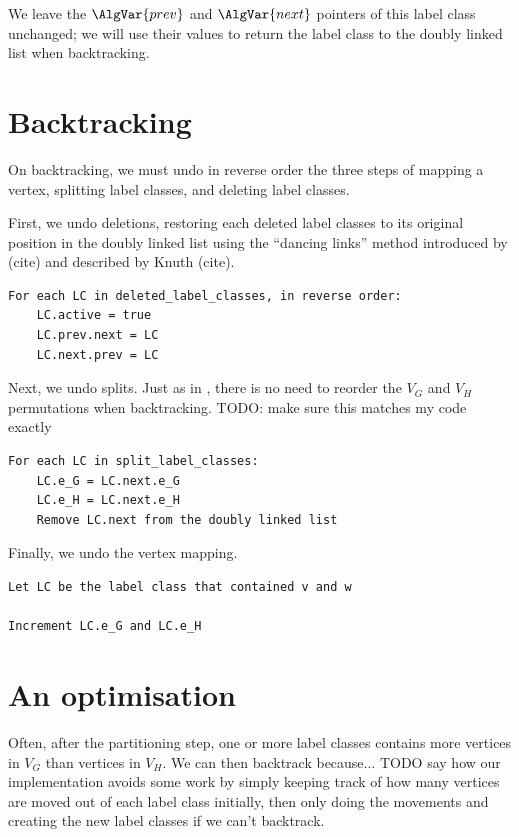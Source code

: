 We leave the $\AlgVar{prev}$ and $\AlgVar{next}$ 
pointers of this label class unchanged; we will use their values to return
the label class to the doubly linked list when backtracking.

\section{Backtracking}

On backtracking, we must undo in reverse order the three steps of
mapping a vertex, splitting label classes, and deleting label classes.

First, we undo deletions, restoring each deleted label classes to its
original position in the doubly linked list using the ``dancing links'' method
introduced by (cite) and described by Knuth (cite).

{
\scriptsize
\begin{verbatim}
For each LC in deleted_label_classes, in reverse order:
    LC.active = true
    LC.prev.next = LC
    LC.next.prev = LC
\end{verbatim}
}

Next, we undo splits.  Just as in \McSplit, there is
no need to reorder the $V_G$ and $V_H$ permutations when backtracking.
TODO: make sure this matches my code exactly

{
\scriptsize
\begin{verbatim}
For each LC in split_label_classes:
    LC.e_G = LC.next.e_G
    LC.e_H = LC.next.e_H
    Remove LC.next from the doubly linked list
\end{verbatim}
}

Finally, we undo the vertex mapping.

{
\scriptsize
\begin{verbatim}
Let LC be the label class that contained v and w

Increment LC.e_G and LC.e_H
\end{verbatim}
}

\section{An optimisation}

Often, after the partitioning step, one or more label classes contains more
vertices in $V_G$ than vertices in $V_H$.  We can then backtrack because...
TODO say how our implementation avoids some work by simply keeping track of
how many vertices are moved out of each label class initially, then only
doing the movements and creating the new label classes if we can't backtrack.

